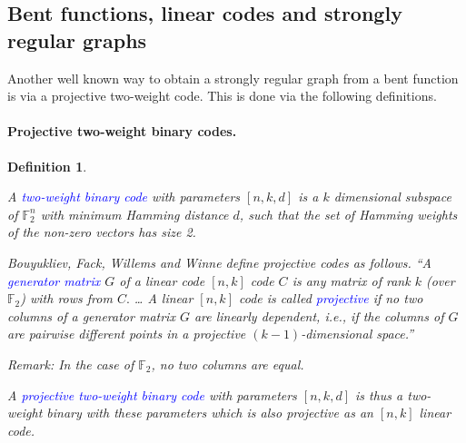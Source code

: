 \documentclass[12pt,a4paper]{article}
\newcommand{\mb}[1]{\mathbb{#1}}
\newcommand{\F}{\mb{F}}
\newcommand{\Emph}[1]{\emph{\textcolor{blue}{#1}}}
\newtheorem{Definition}{Definition}
\begin{document}
%
\subsection{Bent functions, linear codes and strongly regular graphs}
Another well known way to obtain a strongly regular graph from a bent function is via a projective two-weight
code.
This is done via the following definitions.
\paragraph*{Projective two-weight binary codes.}

\begin{Definition}
\label{def-two-weight-codes}
\cite{BouFFWW2006} \cite{Ton96uniformly}

A \Emph{two-weight binary code} with parameters $[n,k,d]$ is a $k$ dimensional subspace of $\F_2^n$
with
minimum Hamming distance $d$, such that the set of Hamming weights of the non-zero vectors has size
2.

Bouyukliev, Fack, Willems and Winne \cite[p. 60]{BouFFWW2006} define projective codes as follows.
``A \Emph{generator matrix} $G$ of a linear code $[n, k]$ code $C$ is any matrix
of rank $k$ (over $\F_2$) with rows from $C.$ \ldots
A linear $[n, k]$ code is called \Emph{projective} if no two columns of a generator matrix
$G$ are linearly dependent, i.e., if the columns of $G$ are pairwise different points in a
projective $(k-1)$-dimensional space.''

Remark: In the case of $\F_2$, no two columns are equal.

A \Emph{projective two-weight binary code} with parameters $[n, k, d]$ is thus a
two-weight binary with these parameters which is also projective as an $[n, k]$ linear code.
%
%
%
\end{Definition}
\end{document}
